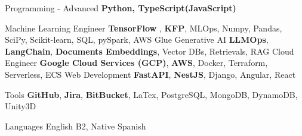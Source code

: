 \cvskill
{Programming - Advanced} %
{\textbf{Python, TypeScript(JavaScript)}} %

\cvskill
{Machine Learning Engineer}
{\textbf{TensorFlow} , \textbf{KFP}, MLOps, Numpy, Pandas, SciPy, Scikit-learn, SQL, pySpark, AWS Glue}
\cvskill
{Generative AI}
{\textbf{LLMOps}, \textbf{LangChain}, \textbf{Documents Embeddings}, Vector DBs,  Retrievals, RAG}
\cvskill
{Cloud Engineer}
{\textbf{Google Cloud Services (GCP)}, \textbf{AWS}, Docker, Terraform, Serverless, ECS}
\cvskill
{Web Development} %
{\textbf{FastAPI}, \textbf{NestJS}, Django, Angular, React} %

\cvskill
{Tools}
{\textbf{GitHub}, \textbf{Jira}, \textbf{BitBucket}, LaTex, PostgreSQL, MongoDB, DynamoDB, Unity3D}

\cvskill
{Languages} %
{English B2, Native Spanish} %

